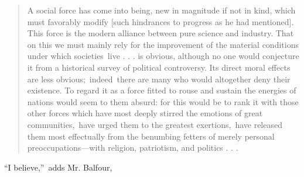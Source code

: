 \documentclass[twoside,symmetric,nobib,justified]{tufte-book}
\begin{document}
\begin{quote}
A social force has come into being, new in magnitude if not in kind,
which must favorably modify {[}such hindrances to progress as he had
mentioned{]}. This force is the modern alliance between pure science and
industry. That on this we must mainly rely for the improvement of the
material conditions under which societies~live . . . is obvious,
although no one would conjecture it from a historical survey of
political controversy. Its direct moral effects are less
obvious;~indeed~there are many who would altogether deny their
existence. To regard it as a force fitted to rouse and sustain the
energies of nations would seem to them absurd: for this would be to rank
it with those other forces which have most deeply stirred the emotions
of great communities,~have urged them to the greatest exertions,~have
released them most effectually from the benumbing fetters of merely
personal preoccupations---with religion, patriotism, and politics . . .~
\end{quote}

``I believe,''~adds Mr. Balfour,~
\end{document}
